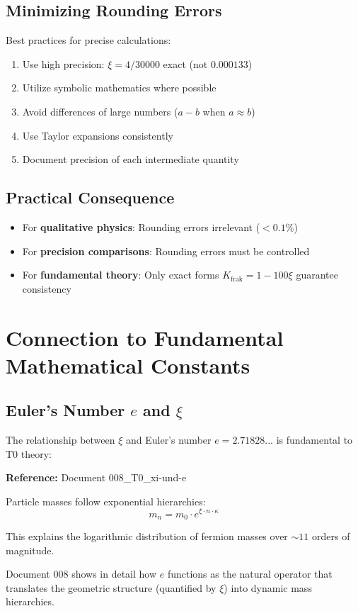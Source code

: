 	\subsection{Minimizing Rounding Errors}
	
	Best practices for precise calculations:
	\begin{enumerate}
		\item Use high precision: $\xi = 4/30000$ exact (not $0.000133$)
		\item Utilize symbolic mathematics where possible
		\item Avoid differences of large numbers ($a - b$ when $a \approx b$)
		\item Use Taylor expansions consistently
		\item Document precision of each intermediate quantity
	\end{enumerate}
	
	\subsection{Practical Consequence}
	
	\begin{itemize}
		\item For \textbf{qualitative physics}: Rounding errors irrelevant ($< 0.1\%$)
		\item For \textbf{precision comparisons}: Rounding errors must be controlled
		\item For \textbf{fundamental theory}: Only exact forms $K_{\text{frak}} = 1 - 100\xi$ guarantee consistency
	\end{itemize}
	
	\section{Connection to Fundamental Mathematical Constants}
	
	\subsection{Euler's Number $e$ and $\xi$}
	
	The relationship between $\xi$ and Euler's number $e = 2.71828...$ is fundamental to T0 theory:
	
	\begin{tcolorbox}[colback=cyan!5!white,colframe=cyan!75!black,title={Exponential Forms in T0}]
		\textbf{Reference:} Document 008\_T0\_xi-und-e
		
		Particle masses follow exponential hierarchies:
		\begin{equation}
			m_n = m_0 \cdot e^{\xi \cdot n \cdot \kappa}
		\end{equation}
		
		This explains the logarithmic distribution of fermion masses over $\sim 11$ orders of magnitude.
		
		Document 008 shows in detail how $e$ functions as the natural operator that translates the geometric structure (quantified by $\xi$) into dynamic mass hierarchies.
	\end{tcolorbox}
	

